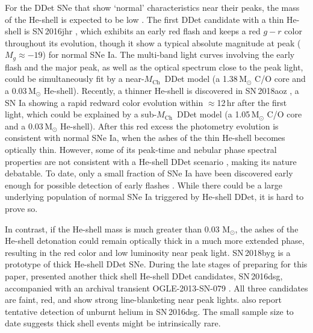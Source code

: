 \documentclass[twocolumn]{aastex631}
\newcommand{\Mch}{$M_\mathrm{Ch}$}
\begin{document}
For the DDet SNe that show `normal' characteristics near their peaks, the mass of the He-shell is expected to be low \citep[$\lesssim$0.03\,$\mathrm{M_\odot}$;][]{Kromer_DD_2010,Sim_2010,Shen_DD_2018,polin_observational_2019}. The first DDet candidate with a thin He-shell is SN\,2016jhr \citep{jiang_16jhr_2017}, which exhibits an early red flash and keeps a red $g-r$ color throughout its evolution, though it show a typical absolute magnitude at peak ($M_g\approx-19$) for normal SNe Ia. The multi-band light curves involving the early flash and the major peak, as well as the optical spectrum close to the peak light, could be simultaneously fit by a near-\Mch\ DDet model (a 1.38\,$\mathrm{M_\odot}$ C/O core and a 0.03\,$\mathrm{M_\odot}$ He-shell). Recently, a thinner He-shell is discovered in SN\,2018aoz \citep{Ni_2022}, a SN Ia showing a rapid redward color evolution within $\approx$12\,hr after the first light, which could be explained by a sub-\Mch\ DDet model (a 1.05\,$\mathrm{M_\odot}$ C/O core and a 0.03\,$\mathrm{M_\odot}$ He-shell). After this red excess the photometry evolution is consistent with normal SNe Ia, when the ashes of the thin He-shell becomes optically thin. However, some of its peak-time and nebular phase spectral properties are not consistent with a He-shell DDet scenario \citep{Ni_2022b}, making its nature debatable. To date, only a small fraction of SNe Ia have been discovered early enough for possible detection of early flashes \citep[e.g.,][]{Deckers_2022}. While there could be a large underlying population of normal SNe Ia triggered by He-shell DDet, it is hard to prove so.

In contrast, if the He-shell mass is much greater than 0.03\,$\,\mathrm{M_\odot}$, the ashes of the He-shell detonation could remain optically thick in a much more extended phase, resulting in the red color and low luminosity near peak light. SN\,2018byg \citep{de_18byg_2019} is a prototype of thick He-shell DDet SNe. During the late stages of preparing for this paper, \citet{Dong_16dsg_2022} presented another thick shell He-shell DDet candidates, SN\,2016dsg, accompanied with an archival transient OGLE-2013-SN-079 \citep{Inserra_OGLE13_079_2015}. All three candidates are faint, red, and show strong line-blanketing near peak lights. \citet{Dong_16dsg_2022} also report tentative detection of unburnt helium in SN\,2016dsg. The small sample size to date suggests thick shell events might be intrinsically rare.
\end{document}
